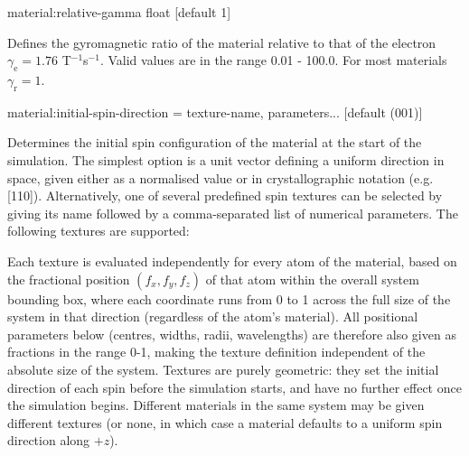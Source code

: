 
{\zicf material:relative-gamma float [default 1]} Defines the gyromagnetic ratio of the material relative to that of the electron $\gamma_{\mathrm{e}} = 1.76$ T$^{-1}$s$^{-1}$. Valid values are in the range 0.01 - 100.0. For most materials $\gamma_{\mathrm{r}} = 1$.

{\zicf material:initial-spin-direction = texture-name, parameters... [default (001)]} Determines the initial spin configuration of the material at the start of the simulation. The simplest option is a unit vector defining a uniform direction in space, given either as a normalised value or in crystallographic notation (e.g. [110]). Alternatively, one of several predefined spin textures can be selected by giving its name followed by a comma-separated list of numerical parameters. The following textures are supported:

Each texture is evaluated independently for every atom of the material, based on the fractional position $(f_x, f_y, f_z)$ of that atom within the overall system bounding box, where each coordinate runs from 0 to 1 across the full size of the system in that direction (regardless of the atom's material). All positional parameters below (centres, widths, radii, wavelengths) are therefore also given as fractions in the range 0-1, making the texture definition independent of the absolute size of the system. Textures are purely geometric: they set the initial direction of each spin before the simulation starts, and have no further effect once the simulation begins. Different materials in the same system may be given different textures (or none, in which case a material defaults to a uniform spin direction along $+z$).


